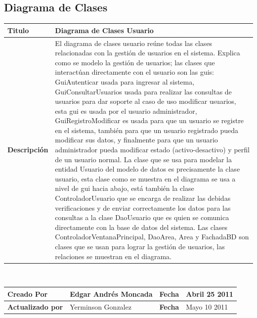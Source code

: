 %
%

\subsection{Diagrama de Clases}
				
	\begin{tabular}{|p{5cm}|p{11cm}|}\hline
	{\bf Titulo} & {Diagrama de Clases Usuario}\\
	\hline
	{\bf Descripción} & {El diagrama de clases usuario reúne todas las clases
	relacionadas con la gestión de usuarios en el sistema.\newline
	Explica como se modelo la gestión de usuarios; las clases que interactúan 
	directamente con el usuario	son las guis: GuiAutenticar usada para ingresar
	al sistema, GuiConsultarUsuarios usada para realizar las consultas de usuarios
	para dar soporte al caso de uso modificar usuarios, esta gui es usada por el usuario
	administrador, GuiRegistroModificar es usada para que un usuario se registre
	en el sistema, también para que un usuario registrado pueda modificar sus datos, y
	finalmente para que un usuario administrador pueda modificar estado (activo-desactivo) y
	perfil de un usuario normal. \newline
	La clase que se usa para modelar la entidad Usuario del modelo de datos es precisamente
	la clase usuario, esta clase como se muestra en el diagrama se usa a nivel de gui hacia
	abajo, está también la clase ControladorUsuario que se encarga de realizar las debidas
	verificaciones y de enviar correctamente los datos para las consultas a la clase DaoUsuario 
	que es quien se comunica directamente con la base de datos del sistema.\newline
	Las clases ControladorVentanaPrincipal, DaoArea, Area y FachadaBD son clases que se usan para 
	lograr la gestión de usuarios, las relaciones se muestran en el diagrama.}\\
	\hline
	\end{tabular}\\[.5cm]
		
	\begin{tabular}{|p{3.5cm}|p{4.5cm}|p{2.5cm}|p{4.5cm}|}\hline
	{\bf Creado Por} & {Edgar Andrés Moncada} & {\bf Fecha} & {Abril 25 2011}\\
	\hline
	{\bf Actualizado por} & {Yerminson Gonzalez} & {\bf Fecha} & {Mayo 10 2011}\\
	\hline
	\end{tabular}

